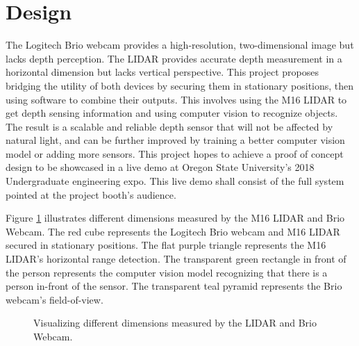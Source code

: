 \documentclass{article}
\begin{document}
\section{Design}
\label{sec:Design}
    The Logitech Brio webcam provides a high-resolution, two-dimensional image but lacks depth perception.
		The LIDAR provides accurate depth measurement in a horizontal dimension but lacks vertical perspective.
		This project proposes bridging the utility of both devices by securing them in stationary positions, then using software to combine their outputs.
		This involves using the M16 LIDAR to get depth sensing information and using computer vision to recognize objects.
		The result is a scalable and reliable depth sensor that will not be affected by natural light, and can be further improved by training a better computer vision model or adding more sensors.
		This project hopes to achieve a proof of concept design to be showcased in a live demo at Oregon State University's 2018 Undergraduate engineering expo.			
		This live demo shall consist of the full system pointed at the project booth's audience. 

		Figure \ref{fig:fig1}  illustrates different dimensions measured by the M16 LIDAR and Brio Webcam.
		The red cube represents the Logitech Brio webcam and M16 LIDAR secured in stationary positions.
		The flat purple triangle represents the M16 LIDAR's horizontal range detection.
		The transparent green rectangle in front of the person represents the computer vision model recognizing that there is a person in-front of the sensor.
    The transparent teal pyramid represents the Brio webcam's field-of-view.

    \begin{figure}
      \centering
      \caption{Visualizing different dimensions measured by the LIDAR and Brio Webcam.}
      \label{fig:fig1}
    \end{figure}
\end{document}
